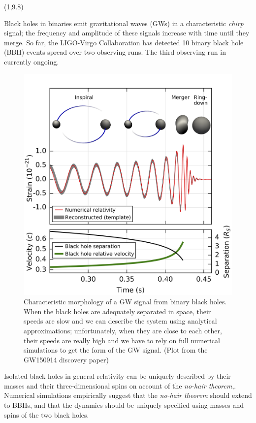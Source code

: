 \documentclass[a1,portrait]{a1poster}
\newcommand{\headingcolor}{\color{BannerElevenColor}}
\def\LHead#1{\noindent{\LARGE \headingcolor #1}\smallskip}
\begin{document}
\begin{textblock}{7}(1,9.8)	%
\LHead{Background}

Black holes in binaries emit gravitational waves (GWs) in a characteristic \textit{chirp} signal; the frequency and amplitude of these signals increase with time until they merge. So far, the LIGO-Virgo Collaboration has detected 10 binary black hole (BBH) events spread over two observing runs. The third observing run in currently ongoing.
\begin{figure}[t]
	\centering
	\includegraphics[scale=2]{fig-3.png}
	\caption{\small{Characteristic morphology of a GW signal from binary black holes. When the black holes are adequately separated in space, their speeds are slow and we can describe the system using analytical approximations; unfortunately, when they are close to each other, their speeds are really high and we have to rely on full numerical simulations to get the form of the GW signal. (Plot from the GW150914 discovery paper)}}
	\label{fig:hybridTD_l2m2}
\end{figure}


Isolated black holes in general relativity can be uniquely described by their masses and their three-dimensional spins on account of the \textit{no-hair theorem},. Numerical simulations empirically suggest that the \textit{no-hair theorem} should extend to BBHs, and that the dynamics should be uniquely specified using masses and spins of the two black holes.


\end{textblock}
\end{document}
